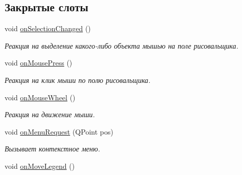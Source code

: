 \subsection*{Закрытые слоты}
\begin{DoxyCompactItemize}
\item 
void \hyperlink{class_graph_window_ab41020bb6d02870bd0f2ccca51cb4837}{on\+Selection\+Changed} ()\hypertarget{class_graph_window_ab41020bb6d02870bd0f2ccca51cb4837}{}\label{class_graph_window_ab41020bb6d02870bd0f2ccca51cb4837}

\begin{DoxyCompactList}\small\item\em Реакция на выделение какого-\/либо объекта мышью на поле рисовальщика. \end{DoxyCompactList}\item 
void \hyperlink{class_graph_window_a678bb0942c6ca67d1ec366ea6c3f9c8e}{on\+Mouse\+Press} ()\hypertarget{class_graph_window_a678bb0942c6ca67d1ec366ea6c3f9c8e}{}\label{class_graph_window_a678bb0942c6ca67d1ec366ea6c3f9c8e}

\begin{DoxyCompactList}\small\item\em Реакция на клик мыши по полю рисовальщика. \end{DoxyCompactList}\item 
void \hyperlink{class_graph_window_a1731d19496de65b3b1a3e125afa8a41a}{on\+Mouse\+Wheel} ()\hypertarget{class_graph_window_a1731d19496de65b3b1a3e125afa8a41a}{}\label{class_graph_window_a1731d19496de65b3b1a3e125afa8a41a}

\begin{DoxyCompactList}\small\item\em Реакция на движение мыши. \end{DoxyCompactList}\item 
void \hyperlink{class_graph_window_a2cc0f9b9b91ccb7c3d203670467a556e}{on\+Menu\+Request} (Q\+Point pos)
\begin{DoxyCompactList}\small\item\em Вызывает контекстное меню. \end{DoxyCompactList}\item 
void \hyperlink{class_graph_window_ac8a8d86f74361c73bf0a75254e7ee069}{on\+Move\+Legend} ()\hypertarget{class_graph_window_ac8a8d86f74361c73bf0a75254e7ee069}{}\label{class_graph_window_ac8a8d86f74361c73bf0a75254e7ee069}


\end{DoxyCompactItemize}
